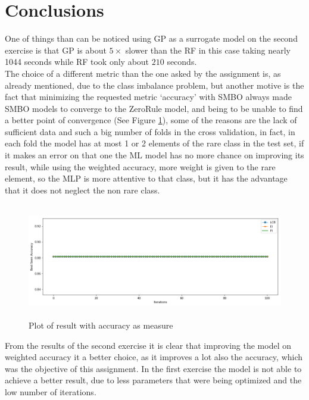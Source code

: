 \documentclass[12pt, onecolumn]{article}
\begin{document}
\section*{Conclusions}
One of things than can be noticed using GP as a surrogate model on the second exercise is that GP is about $5\times$ slower than the RF in this case taking nearly 1044 seconds while RF took only about $210$ seconds.\\
The choice of a different metric than the one asked by the assignment is, as already mentioned, due to the class imbalance problem, but another motive is the fact that minimizing the requested metric `accuracy' with SMBO always made SMBO models to converge to the ZeroRule model, and being to be unable to find a better point of convergence (See Figure \ref{fig:second_acc}), some of the reasons are the lack of sufficient data and such a big number of folds in the cross validation, in fact, in each fold the model has at most 1 or 2 elements of the rare class in the test set, if it makes an error on that one the ML model has no more chance on improving its result, while using the weighted accuracy, more weight is given to the rare element, so the MLP is more attentive to that class, but it has the advantage that it does not neglect the non rare class.    
\begin{figure}[!h]
  \centering
  \includegraphics[width=\linewidth, height=5cm]{imgs/second_comparision_accuracy.png}
  \caption{Plot of result with accuracy as measure}
  \label{fig:second_acc}
\end{figure}
From the results of the second exercise it is clear that improving the model on weighted accuracy it a better choice, as it improves a lot also the accuracy, which was the objective of this assignment.
In the first exercise the model is not able to achieve a better result, due to less parameters that were being optimized and the low number of iterations.\\
\end{document}
